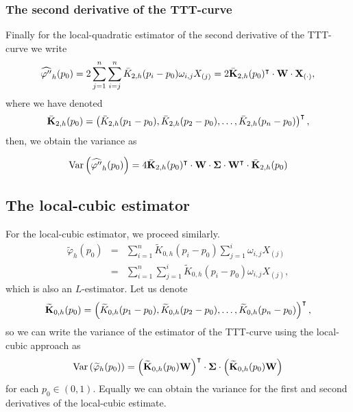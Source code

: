 \documentclass[preprint,12pt]{elsarticle}
\begin{document}
\subsubsection*{The second derivative of the TTT-curve}
\noindent Finally for the local-quadratic estimator of the second derivative of the TTT-curve we write
\begin{equation*}
\widehat{\varphi''}_h(p_0)= 2 \sum_{j=1}^n \sum_{i=j}^n \bar{K}_{2,h}(p_i-p_0)\omega_{i,j}X_{(j)}=2 \bar{\bf K}_{2,h}(p_0)^{\intercal} \cdot {\bf W} \cdot{\bf X}_{(\cdot)}, 
\end{equation*}
where we have denoted 
$$\bar{\bf K}_{2,h}(p_0)=\left(\bar{ K}_{2,h}(p_1-p_0), \bar{ K}_{2,h}(p_2-p_0),\ldots,\bar{ K}_{2,h}(p_n-p_0)\right)^{\intercal},$$
then,  we obtain the variance as 

\begin{equation}\label{V.phi2}
{\rm Var} \left(\widehat{\varphi''}_h(p_0)\right)=4  \bar{\bf K}_{2,h}(p_0)^{\intercal}\cdot {\bf W} \cdot {\boldsymbol{\Sigma}}\cdot  {\bf W}^{\intercal}\cdot \bar{\bf K}_{2,h}(p_0)
\end{equation}
%
\bigskip
\subsection{The local-cubic estimator}
\noindent For the local-cubic estimator, we proceed similarly.
\begin{eqnarray*}
\widetilde{\varphi}_h(p_0)&=&\sum_{i=1}^n \widetilde{K}_{0,h}(p_i-p_0)\sum_{j=1}^i\omega_{i,j}X_{(j)} \\
&=& \sum_{i=1}^n \sum_{j=1}^i \widetilde{K}_{0,h}(p_i-p_0)\omega_{i,j}X_{(j)},
\end{eqnarray*}
which is also an $L$-estimator. Let us denote 
$$\widetilde{\bf K}_{0,h}(p_0)=\left(\widetilde{ K}_{0,h}(p_1-p_0), \widetilde{ K}_{0,h}(p_2-p_0),\ldots,\widetilde{ K}_{0,h}(p_n-p_0)\right)^{\intercal},$$
 so we can write the variance of the estimator of the TTT-curve using the local-cubic approach as
\begin{equation}\label{V.phi0.cubic}
{\rm Var} \left(\widetilde{\varphi}_h(p_0)\right)= \left(\widetilde{\bf K}_{0,h}(p_0) {\bf W}\right)^{\intercal}\cdot {\boldsymbol{\Sigma}} \cdot\left(\widetilde{\bf K}_{0,h}(p_0) {\bf W}\right)
\end{equation}
for each $p_0 \in (0,1)$. Equally we can obtain the variance for the first and second derivatives of the local-cubic estimate.
\end{document}
